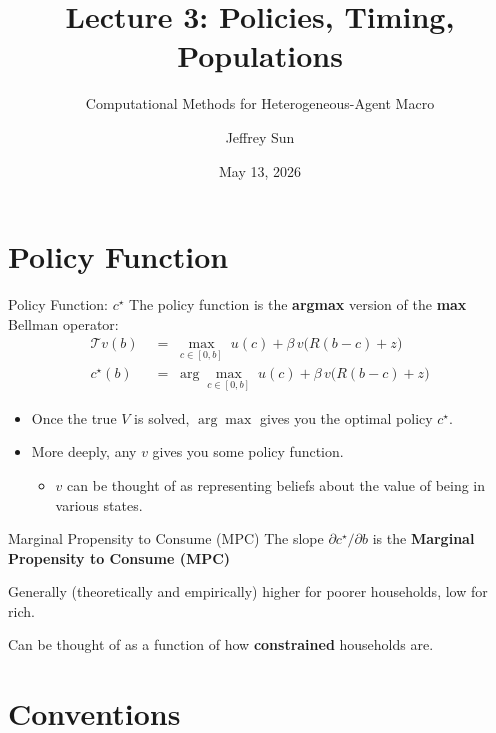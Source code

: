 \documentclass[10pt,aspectratio=169]{beamer}
\title{Lecture 3: Policies, Timing, Populations}
\subtitle{Computational Methods for Heterogeneous-Agent Macro}
\author{Jeffrey Sun}
\institute{University of Toronto}
\date{May 13, 2026}
\begin{document}
\maketitle

\section{Policy Function}

\begin{frame}{Policy Function: $c^\star$}
  The policy function is the \textbf{argmax} version of the \textbf{max} Bellman operator:
  \begin{align*}
    \mathcal{T}v(b)        &\;=\; \max_{c \in [0, b]} \; u(c) + \beta \, v\!\big(R(b - c) + z\big) \tag{Bellman Operator} \\[0.4em]
    c^\star(b)  &\;=\; \arg\max_{c \in [0, b]} \; u(c) + \beta \, v\!\big(R(b - c) + z\big) \tag{Policy Function}
  \end{align*}
  \begin{itemize}
    \item Once the true $V$ is solved, $\arg\max$ gives you the optimal policy $c^\star$.
    \item More deeply, any $v$ gives you some policy function.
    \begin{itemize}
      \item $v$ can be thought of as representing beliefs about the value of being in various states.
    \end{itemize}
  \end{itemize}
\end{frame}

\begin{frame}{Marginal Propensity to Consume (MPC)}
  The slope $\partial c^\star / \partial b$ is the \textbf{Marginal Propensity to Consume (MPC)}
  
  Generally (theoretically and empirically) higher for poorer households, low for rich.

  Can be thought of as a function of how \textbf{constrained} households are.
\end{frame}

\section{Conventions}
\end{document}
